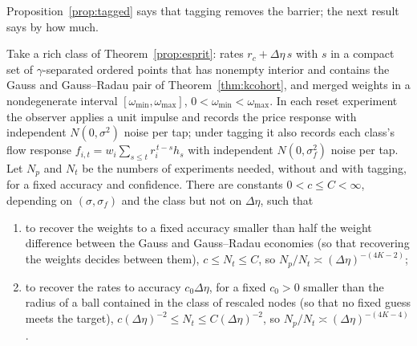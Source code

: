 Proposition~\ref{prop:tagged} says that tagging removes the barrier; the next result says by how much.

\begin{theorem}\label{thm:discvalue}
Take a rich class of Theorem~\ref{prop:esprit}: rates $r_c+\Delta\eta\,s$ with $s$ in a compact set of $\gamma$-separated ordered points that has nonempty interior and contains the Gauss and Gauss--Radau pair of Theorem~\ref{thm:kcohort}, and merged weights in a nondegenerate interval $[\omega_{\min},\omega_{\max}]$, $0<\omega_{\min}<\omega_{\max}$. In each reset experiment the observer applies a unit impulse and records the price response with independent $N(0,\sigma^2)$ noise per tap; under tagging it also records each class's flow response $f_{i,t}=w_i\sum_{s\le t}r_i^{\,t-s}h_s$ with independent $N(0,\sigma_f^2)$ noise per tap. Let $N_p$ and $N_t$ be the numbers of experiments needed, without and with tagging, for a fixed accuracy and confidence. There are constants $0<c\le C<\infty$, depending on $(\sigma,\sigma_f)$ and the class but not on $\Delta\eta$, such that
\begin{enumerate}[label=(\roman*),itemsep=1pt]
\item to recover the weights to a fixed accuracy smaller than half the weight difference between the Gauss and Gauss--Radau economies (so that recovering the weights decides between them), $c\le N_t\le C$, so $N_p/N_t\asymp(\Delta\eta)^{-(4K-2)}$;
\item to recover the rates to accuracy $c_0\Delta\eta$, for a fixed $c_0>0$ smaller than the radius of a ball contained in the class of rescaled nodes (so that no fixed guess meets the target), $c(\Delta\eta)^{-2}\le N_t\le C(\Delta\eta)^{-2}$, so $N_p/N_t\asymp(\Delta\eta)^{-(4K-4)}$.
\end{enumerate}
\end{theorem}

